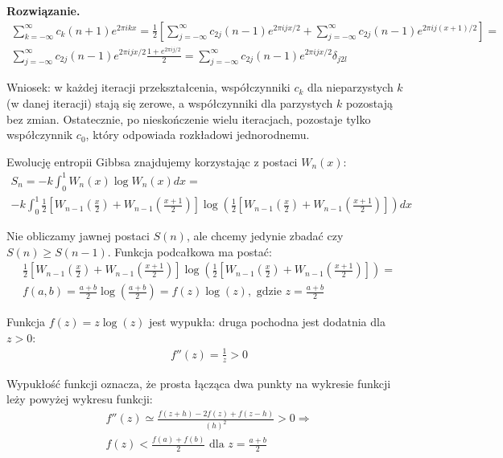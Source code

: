\documentclass[11pt,a4paper]{article}
\newenvironment{solution}{\vspace{1cm} \par\textbf{Rozwiązanie.} \vspace{1cm}}{}
\begin{document}
\begin{solution}
\begin{align*}
\sum_{k=-\infty}^{\infty} c_k(n+1) e^{2\pi i k x} = 
\frac{1}{2}\left[ \sum_{j=-\infty}^{\infty} c_{2j}(n-1) e^{2\pi i j x/2} + 
\sum_{j=-\infty}^{\infty} c_{2j}(n-1) e^{2\pi i j (x+1)/2} \right] = \\
\sum_{j=-\infty}^{\infty} c_{2j}(n-1) e^{2\pi i j x/2} \frac{1 + e^{2\pi i j / 2}}{2} = 
\sum_{j=-\infty}^{\infty} c_{2j}(n-1) e^{2\pi i j x/2} \delta_{j 2l} 
\end{align*}

Wniosek: w każdej iteracji przekształcenia, 
współczynniki $c_k$ dla nieparzystych $k$ (w danej iteracji) stają się zerowe, 
a współczynniki dla parzystych $k$ pozostają bez zmian. 
Ostatecznie, po nieskończenie wielu iteracjach, pozostaje 
tylko współczynnik $c_0$, który odpowiada rozkładowi jednorodnemu.

\vspace{1cm}

Ewolucję entropii Gibbsa znajdujemy korzystając z postaci $W_n(x)$:
\begin{align*}
S_n = -k\int_0^1 W_n(x)\log W_n(x) dx = \\
-k\int_0^1 \frac{1}{2}\left[W_{n-1}\left(\frac{x}{2}\right) + W_{n-1}\left(\frac{x+1}{2}\right)\right] \log\left( \frac{1}{2}\left[W_{n-1}\left(\frac{x}{2}\right) + W_{n-1}\left(\frac{x+1}{2}\right)\right] \right) dx
\end{align*}

Nie obliczamy jawnej postaci $S(n)$, ale chcemy jedynie zbadać 
czy $S(n) \geq S(n-1)$. Funkcja podcałkowa ma postać:
\begin{align*}
\frac{1}{2}\left[W_{n-1}\left(\frac{x}{2}\right) + W_{n-1}\left(\frac{x+1}{2}\right)\right] \log\left( \frac{1}{2}\left[W_{n-1}\left(\frac{x}{2}\right) + W_{n-1}\left(\frac{x+1}{2}\right)\right] \right) = \\
f(a, b) = \frac{a + b}{2} \log\left( \frac{a + b}{2} \right) = f(z)\log(z), \text{ gdzie } z = \frac{a + b}{2}
\end{align*}

Funkcja $f(z) = z\log(z)$ jest wypukła: druga pochodna jest dodatnia dla $z > 0$:
\begin{align*}
f''(z) = \frac{1}{z} > 0
\end{align*}

Wypukłość funkcji oznacza, że prosta łącząca 
dwa punkty na wykresie funkcji leży powyżej wykresu funkcji:
\begin{align*}
  f''(z) \simeq \frac{f(z+h) - 2f(z) + f(z-h)}{(h)^2} > 0 \Rightarrow \\
f(z) < \frac{f(a) + f(b)}{2} \text{ dla } z = \frac{a + b}{2}
\end{align*}


\end{solution}
\end{document}
